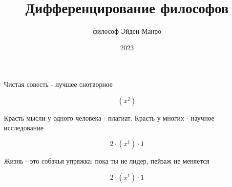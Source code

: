 \documentclass[a4paper,12pt]{article}
\title{\textbf{Дифференцирование философов}}
\author{философ Эйден Манро}
\date{2023}
\begin{document}
\maketitle
\begin{center}
Чистая совесть - лучшее снотворное
\end{center}


\begin{center}
\begin{equation}
(x^{2})
\end{equation}
\end{center}

\begin{center}
Красть мысли у одного человека - плагиат. Красть у многих - научное исследование
\end{center}


\begin{center}
\begin{equation}
2 \cdot (x^{1}) \cdot 1
\end{equation}
\end{center}

\begin{center}
Жизнь - это собачья упряжка: пока ты не лидер, пейзаж не меняется
\end{center}


\begin{center}
\begin{equation}
2 \cdot (x^{1}) \cdot 1
\end{equation}
\end{center}
\end{document}

